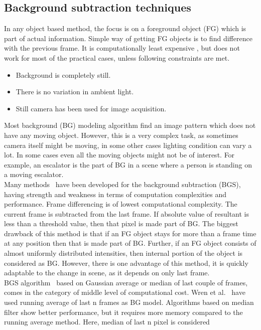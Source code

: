 \subsection{Background subtraction techniques}
\label{bg_subs_technique}
\indent In any object based method, the focus is on a foreground object
(FG) which is part of actual information. Simple way of getting FG
objects is to find difference with the previous frame. It is
computationally least expensive , but does not work for most of the
practical cases, unless following constraints are met.
\begin{itemize}
 \item Background is completely still.
 \item There is no variation in ambient light.
 \item Still camera has been used for image acquisition.
\end{itemize}
\indent Most background (BG) modeling algorithm find an image pattern
which does not have any moving object. However, this is a very complex
task, as sometimes camera itself might be moving, in some other cases
lighting condition can vary a lot. In some cases even all the moving
objects might not be of interest. For example, an escalator is the part
of BG in a scene where a person is standing on a moving escalator.\\
\indent Many methods~\cite{9, 10, 11, 12, 13, 14} have been developed
for the background subtraction (BGS), having strength and weakness in
terms of computation complexities and performance. Frame differencing is
of lowest computational complexity. The current frame is subtracted from
the last frame. If absolute value of resultant is less than a threshold
value, then that pixel is made part of BG. The biggest drawback of this
method is that if an FG object stays for more than a frame time at any
position then that is made part of BG. Further, if an FG object consists
of almost uniformly distributed intensities, then internal portion of
the object is considered as BG. However, there is one advantage of this
method, it is quickly adaptable to the change in scene, as it depends on
only last frame.\\
\indent BGS algorithm~\cite{10, 12, 13, 14, 15} based on Gaussian
average or median of last couple of frames, comes in the category of
middle level of computational cost. Wren et al.~\cite{12} have used
running average of last n frames as BG model. Algorithms based on median
filter show better performance, but it requires more memory compared to
the running average method. Here, median of last n pixel is considered
